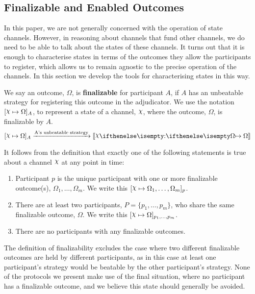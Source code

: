 \documentclass{article}
\begin{document}
\subsection{Finalizable and Enabled Outcomes}

In this paper, we are not generally concerned with the operation of state channels.
However, in reasoning about channels that fund other channels, we do need to be able to talk about the states of these channels.
It turns out that it is enough to characterise states in terms of the outcomes they allow the participants to register, which allows us to remain agnostic to the precise operation of the channels.
In this section we develop the tools for characterising states in this way.

We say an outcome, $\Omega$, is \textbf{finalizable} for participant $A$, if $A$ has an unbeatable
strategy for registering this outcome in the adjudicator.
We use the notation $\finalizable{\rchi}{\Omega}{A}$, to represent a state of a channel, $\rchi$,
where the outcome, $\Omega$, is finalizable by $A$.
\begin{align}
  \finalizable{\rchi}{\Omega}{A} \xrightarrow{\text{A's unbeatable strategy}} \adj{\holds{\rchi}{}{\Omega}}
\end{align}

It follows from the definition that exactly one of the following statements is true about
a channel $\rchi$ at any point in time:
\begin{enumerate}
  \item Participant $p$ is the unique participant with one or more finalizable outcome(s), $\Omega_1, \dots, \Omega_m$.
        We write this $\finalizable{\rchi}{\Omega_1, \dots, \Omega_m}{p}$.
  \item There are at least two participants, $P = \{p_1, \dots, p_m \}$, who share the same
        finalizable outcome, $\Omega$. We write this $\finalizable{\rchi}{\Omega}{p_1, \dots, p_m}$.
  \item There are no participants with any finalizable outcomes.
\end{enumerate}
The definition of finalizability excludes the case where two different finalizable outcomes are held
by different participants, as in this case at least one participant's strategy would be beatable
by the other participant's strategy.
None of the protocols we present make use of the final situation, where no participant has a finalizable outcome, and we believe this state should generally be avoided.
\end{document}
